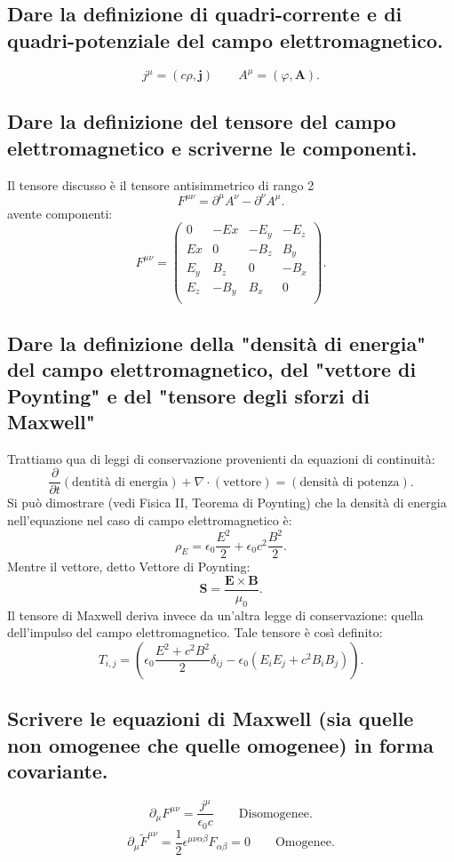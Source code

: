 \subsection[]{Dare la definizione di quadri-corrente e di quadri-potenziale del campo elettromagnetico.}
\label{sec:3.a.1}
\[
	j^{\mu}=\left( c \rho, \boldsymbol{j} \right) \quad \quad 
	A^{\mu}=\left( \varphi, \boldsymbol{A}\right) 
.\] 

\subsection[]{Dare la definizione del tensore del campo elettromagnetico e scriverne le componenti.}
\label{seq:3.a.2}
Il tensore discusso è il tensore antisimmetrico di rango 2
\[
F^{\mu \nu} = \partial^{\mu}A^{\nu} - \partial^{\nu}A^{\mu}  
.\] 
avente componenti:
\[
F^{\mu \nu}=
\left(
\begin{array}{c|ccc}
	0 & -Ex & -E_y & -E_z \\
	\hline
	Ex & 0 & -B_z & B_y \\
	E_y & B_z & 0 & -B_x \\
	E_z  & -B_y & B_x & 0 \\
\end{array}
\right)
.\] 

\subsection[]{Dare la definizione della "densità di energia" del campo elettromagnetico, del "vettore di Poynting" e del "tensore degli sforzi di Maxwell"}
Trattiamo qua di leggi di conservazione provenienti da equazioni di continuità:
\label{sec:3.a.3}
\[
	\frac{\partial}{\partial t} \left(\text{dentità di energia}\right) + \nabla \cdot \left( \text{vettore} \right) = \left( \text{densità di potenza} \right) 
.\] 
Si può dimostrare (vedi Fisica II, Teorema di Poynting) che la densità di energia nell'equazione nel caso di campo elettromagnetico è:
\[
\rho_{E}=\epsilon_0 \frac{E^2}{2}+\epsilon_0c^2 \frac{B^2}{2} 
.\] 
Mentre il vettore, detto Vettore di Poynting:
\[
\boldsymbol{S}= \frac{\boldsymbol{E}\times \boldsymbol{B}}{\mu_0}
.\] 
Il tensore di Maxwell deriva invece da un'altra legge di conservazione: quella dell'impulso del campo elettromagnetico. Tale tensore è così definito:
\[
	T_{i,j}=\left( \epsilon_0 \frac{E^2+c^2B^2}{2}\delta_{ij}-\epsilon_0\left( E_iE_j+c^2B_iB_j \right)  \right) 
.\] 
\subsection[]{Scrivere le equazioni di Maxwell (sia quelle non omogenee che quelle omogenee) in forma covariante.}
\label{sec:3.a.4}
\[
	\partial_{\mu}F^{\mu \nu} = \frac{j^{\mu}}{\epsilon_0c} \quad \quad \text{Disomogenee}
.\]  
\[
	\partial_{\mu} \tilde{F}^{\mu \nu}= \frac{1}{2} \epsilon^{\mu\nu\alpha\beta}F_{\alpha\beta} = 0 \quad \quad \text{Omogenee}
.\]  

